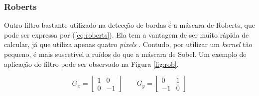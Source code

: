 \documentclass[10pt,a4paper]{article}
\newcommand{\pixels}{\textit{pixels} }
\newcommand{\kernel}{\textit{kernel} }
\begin{document}
\subsubsection{Roberts}
Outro filtro bastante utilizado na detecção de bordas é a máscara de Roberts, que pode ser expressa por (\ref{eq:roberts}). Ela tem a vantagem de ser muito rápida de calcular, já que utiliza apenas quatro \pixels. Contudo, por utilizar um \kernel tão pequeno, é mais suscetível a ruídos do que a máscara de Sobel. Um exemplo de aplicação do filtro pode ser observado na Figura \ref{fig:rob}.

\begin{equation}
  G_x =\left[\begin{array}{cc}
    1 & 0\\
    0 & -1
  \end{array}\right] \qquad
  G_y =\left[\begin{array}{cc}
    0 & 1\\
    -1 & 0
  \end{array}\right]
  \label{eq:roberts}
\end{equation}
\end{document}
